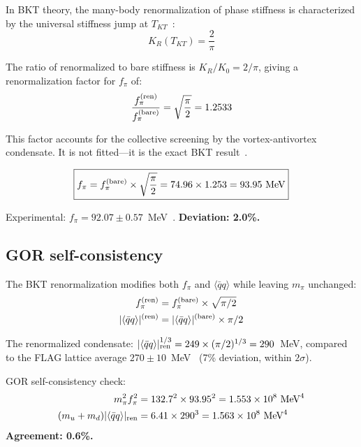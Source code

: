 ﻿\documentclass[twocolumn,showpacs,preprintnumbers,amsmath,amssymb,prc]{revtex4-2}
\begin{document}
In BKT theory, the many-body renormalization of phase stiffness is characterized by the universal stiffness jump at $T_{KT}$~\cite{Nelson1977}:
\begin{equation}
K_R(T_{KT}) = \frac{2}{\pi}
\label{eq:stiffness_jump}
\end{equation}

The ratio of renormalized to bare stiffness is $K_R/K_0 = 2/\pi$, giving a renormalization factor for $f_\pi$ of:
\begin{equation}
\frac{f_\pi^{(\rm ren)}}{f_\pi^{(\rm bare)}} = \sqrt{\frac{\pi}{2}} = 1.2533
\label{eq:bkt_factor}
\end{equation}

This factor accounts for the collective screening by the vortex-antivortex condensate. It is not fitted---it is the exact BKT result~\cite{Kosterlitz1973}.

\begin{equation}
\boxed{f_\pi = f_\pi^{(\rm bare)} \times \sqrt{\frac{\pi}{2}} = 74.96 \times 1.253 = 93.95~\text{MeV}}
\label{eq:fpi_final}
\end{equation}

Experimental: $f_\pi = 92.07 \pm 0.57$~MeV~\cite{PDG2024}. \textbf{Deviation: 2.0\%.}

\subsection{GOR self-consistency}

The BKT renormalization modifies both $f_\pi$ and $\langle\bar{q}q\rangle$ while leaving $m_\pi$ unchanged:
\begin{align}
f_\pi^{(\rm ren)} &= f_\pi^{(\rm bare)} \times \sqrt{\pi/2} \\
|\langle\bar{q}q\rangle|^{(\rm ren)} &= |\langle\bar{q}q\rangle|^{(\rm bare)} \times \pi/2
\end{align}

The renormalized condensate: $|\langle\bar{q}q\rangle|^{1/3}_{\rm ren} = 249 \times (\pi/2)^{1/3} = 290$~MeV, compared to the FLAG lattice average $270 \pm 10$~MeV~\cite{FLAG2021} (7\% deviation, within $2\sigma$).

GOR self-consistency check:
\begin{align}
m_\pi^2 f_\pi^2 &= 132.7^2 \times 93.95^2 = 1.553 \times 10^8~\text{MeV}^4 \\
(m_u+m_d)|\langle\bar{q}q\rangle|_{\rm ren} &= 6.41 \times 290^3 = 1.563 \times 10^8~\text{MeV}^4
\end{align}
\textbf{Agreement: 0.6\%.}
\end{document}
